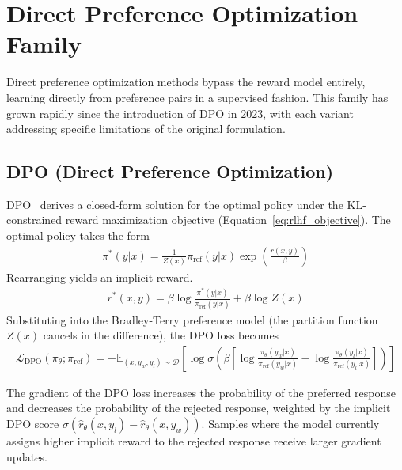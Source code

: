 \documentclass[12pt]{article}
\begin{document}
\section{Direct Preference Optimization Family}

Direct preference optimization methods bypass the reward model entirely, learning directly from preference pairs in a supervised fashion. This family has grown rapidly since the introduction of DPO in 2023, with each variant addressing specific limitations of the original formulation.

\subsection{DPO (Direct Preference Optimization)}

DPO~\cite{Rafailov2023DPO} derives a closed-form solution for the optimal policy under the KL-constrained reward maximization objective (Equation~\ref{eq:rlhf_objective}). The optimal policy takes the form
\begin{align}
\pi^*(y|x) = \frac{1}{Z(x)} \pi_{\text{ref}}(y|x) \exp\!\left(\frac{r(x,y)}{\beta}\right)
\end{align}
Rearranging yields an implicit reward.
\begin{align}
r^*(x,y) = \beta \log \frac{\pi^*(y|x)}{\pi_{\text{ref}}(y|x)} + \beta \log Z(x)
\end{align}
Substituting into the Bradley-Terry preference model (the partition function $Z(x)$ cancels in the difference), the DPO loss becomes
\begin{align}
\mathcal{L}_{\text{DPO}}(\pi_\theta; \pi_{\text{ref}}) = -\mathbb{E}_{(x, y_w, y_l) \sim \mathcal{D}} \left[ \log \sigma\!\left( \beta \left[ \log \frac{\pi_\theta(y_w|x)}{\pi_{\text{ref}}(y_w|x)} - \log \frac{\pi_\theta(y_l|x)}{\pi_{\text{ref}}(y_l|x)} \right] \right) \right]
\end{align}

The gradient of the DPO loss increases the probability of the preferred response and decreases the probability of the rejected response, weighted by the implicit DPO score $\sigma(\hat{r}_\theta(x, y_l) - \hat{r}_\theta(x, y_w))$. Samples where the model currently assigns higher implicit reward to the rejected response receive larger gradient updates.
\end{document}
